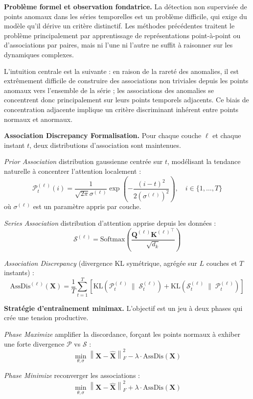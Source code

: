 \documentclass[12pt,a4paper]{article}
\begin{document}
\textbf{Problème formel et observation fondatrice.} La détection non supervisée de points anomaux dans les séries temporelles est un problème difficile, qui exige du modèle qu'il dérive un critère distinctif. Les méthodes précédentes traitent le problème principalement par apprentissage de représentations point-à-point ou d'associations par paires, mais ni l'une ni l'autre ne suffit à raisonner sur les dynamiques complexes.

L'intuition centrale est la suivante : en raison de la rareté des anomalies, il est extrêmement difficile de construire des associations non triviales depuis les points anomaux vers l'ensemble de la série ; les associations des anomalies se concentrent donc principalement sur leurs points temporels adjacents. Ce biais de concentration adjacente implique un critère discriminant inhérent entre points normaux et anormaux.

\textbf{Association Discrepancy  Formalisation.} Pour chaque couche $\ell$ et chaque instant $t$, deux distributions d'association sont maintenues.

\textit{Prior Association}  distribution gaussienne centrée sur $t$, modélisant la tendance naturelle à concentrer l'attention localement :
$$\mathcal{P}^{(\ell)}_t(i) = \frac{1}{\sqrt{2\pi}\sigma^{(\ell)}}\exp\!\left(-\frac{(i-t)^2}{2(\sigma^{(\ell)})^2}\right), \quad i \in \{1,\ldots,T\}$$
où $\sigma^{(\ell)}$ est un paramètre appris par couche.

\textit{Series Association}  distribution d'attention apprise depuis les données :
$$\mathcal{S}^{(\ell)} = \mathrm{Softmax}\!\left(\frac{\mathbf{Q}^{(\ell)}{\mathbf{K}^{(\ell)}}^\top}{\sqrt{d_k}}\right)$$

\textit{Association Discrepancy} (divergence KL symétrique, agrégée sur $L$ couches et $T$ instants) :
$$\mathrm{AssDis}^{(\ell)}(\mathbf{X}) = \frac{1}{T}\sum_{t=1}^{T}\!\left[\mathrm{KL}\!\left(\mathcal{P}^{(\ell)}_t \;\|\; \mathcal{S}^{(\ell)}_t\right) + \mathrm{KL}\!\left(\mathcal{S}^{(\ell)}_t \;\|\; \mathcal{P}^{(\ell)}_t\right)\right]$$

\textbf{Stratégie d'entraînement minimax.} L'objectif est un jeu à deux phases qui crée une tension productive.

\textit{Phase Maximize}  amplifier la discordance, forçant les points normaux à exhiber une forte divergence $\mathcal{P}$ vs $\mathcal{S}$ :
$$\min_{\theta,\sigma}\left\|\mathbf{X} - \hat{\mathbf{X}}\right\|_F^2 - \lambda\cdot\mathrm{AssDis}(\mathbf{X})$$

\textit{Phase Minimize}  reconverger les associations :
$$\min_{\theta,\sigma}\left\|\mathbf{X} - \hat{\mathbf{X}}\right\|_F^2 + \lambda\cdot\mathrm{AssDis}(\mathbf{X})$$
\end{document}
